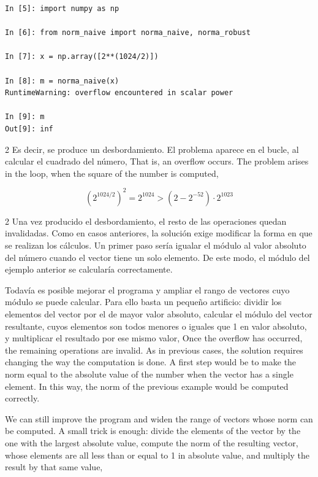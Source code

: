 \begin{verbatim}
In [5]: import numpy as np

In [6]: from norm_naive import norma_naive, norma_robust

In [7]: x = np.array([2**(1024/2)])

In [8]: m = norma_naive(x)
RuntimeWarning: overflow encountered in scalar power

In [9]: m
Out[9]: inf
\end{verbatim}

\begin{paracol}{2}
Es decir, se produce un desbordamiento. El problema aparece en el bucle, al calcular el cuadrado del número,
\switchcolumn
That is, an overflow occurs. The problem arises in the loop, when the square of the number is computed,
\end{paracol}
\begin{equation*}
\left(2^{1024/2}\right)^2=2^{1024}> (2-2^{-52})\cdot 2^{1023}
\end{equation*}
\begin{paracol}{2}
Una vez producido el desbordamiento, el resto de las operaciones quedan invalidadas. Como en casos anteriores, la solución exige modificar la forma en que se realizan los cálculos. Un primer paso sería igualar el módulo al valor absoluto del número cuando el vector tiene un solo elemento. De este modo, el módulo del ejemplo anterior se calcularía correctamente.

Todavía es posible mejorar el programa y ampliar el rango de vectores cuyo módulo se puede calcular. Para ello basta un pequeño artificio: dividir los elementos del vector por el de mayor valor absoluto, calcular el módulo del vector resultante, cuyos elementos son todos menores o iguales que 1 en valor absoluto, y multiplicar el resultado por ese mismo valor,
\switchcolumn
Once the overflow has occurred, the remaining operations are invalid. As in previous cases, the solution requires changing the way the computation is done. A first step would be to make the norm equal to the absolute value of the number when the vector has a single element. In this way, the norm of the previous example would be computed correctly.

We can still improve the program and widen the range of vectors whose norm can be computed. A small trick is enough: divide the elements of the vector by the one with the largest absolute value, compute the norm of the resulting vector, whose elements are all less than or equal to 1 in absolute value, and multiply the result by that same value,
\end{paracol}

